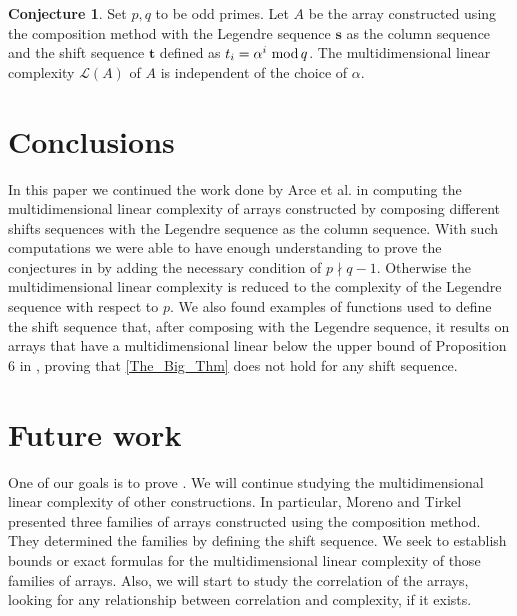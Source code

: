 \documentclass[12pt]{article}
\renewcommand{\mod}{\ \textup{mod}\,}
\theoremstyle{definition}
\theoremstyle{definition}
\theoremstyle{definition}
\newtheorem{conjecture}[theorem]{Conjecture}
\theoremstyle{plain}
\theoremstyle{plain}
\numberwithin{equation}{section}
\begin{document}
\begin{conjecture}\label{conj}
    Set $p,q$ to be odd primes. 
    Let $A$ be the array constructed using the composition method with the Legendre sequence $\mathbf{s}$ as the column sequence and the shift sequence $\mathbf{t}$ defined as $t_i = \alpha^i \mod q$. 
    The multidimensional linear complexity $\mathscr{L}(A)$ of $A$ is independent of the choice of $\alpha$.
\end{conjecture}





\section{Conclusions}
In this paper we continued the work done by Arce et al. in \cite{arce2019multidimensional}computing the multidimensional linear complexity of arrays constructed by composing different shifts sequences with the Legendre sequence as the column sequence. 
With such computations we were able to have enough understanding to prove the conjectures in \cite{arce2019multidimensional} by adding the necessary condition of $p\nmid q-1$.
Otherwise the multidimensional linear complexity is reduced to the complexity of the Legendre sequence with respect to $p$. 
We also found examples of functions used to define the shift sequence that, after composing with the Legendre sequence, it results on arrays that have a multidimensional linear below the upper bound of Proposition 6 in \cite{arce2019multidimensional}, proving that \cref{The_Big_Thm} does not hold for any shift sequence.

\section{Future work}
One of our goals is to prove .
We will continue studying the multidimensional linear complexity of other constructions. 
In particular, Moreno and Tirkel \cite{moreno2012new} presented three families of arrays constructed using the composition method. 
They determined the families by defining the shift sequence. 
We seek to establish bounds or exact formulas for the multidimensional linear complexity of those families of arrays. 
Also, we will start to study the correlation of the arrays, looking for any relationship between correlation and complexity, if it exists. 
\end{document}
